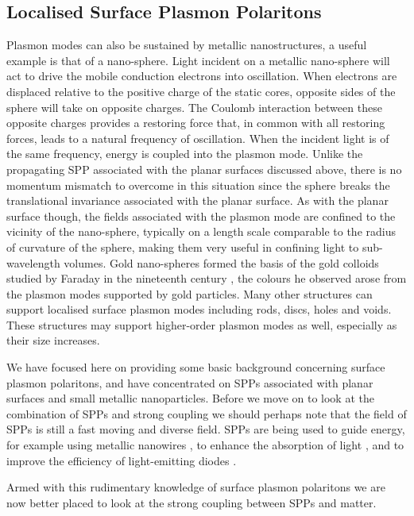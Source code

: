 \documentclass[12pt]{iopart}
\begin{document}
\subsection{Localised Surface Plasmon Polaritons}

Plasmon modes can also be sustained by metallic nanostructures, a useful example is that of a nano-sphere. Light incident on a metallic nano-sphere will act to drive the mobile conduction electrons into oscillation. When electrons are displaced relative to the positive charge of the static cores, opposite sides of the sphere will take on opposite charges. 
The Coulomb interaction between these opposite charges provides a restoring force that, in common with all restoring forces, leads to a natural frequency of oscillation. When the incident light is of the same frequency, energy is coupled into the plasmon mode. Unlike the propagating SPP associated with the planar surfaces discussed above, there is no momentum mismatch to overcome in this situation since the sphere breaks the translational invariance associated with the planar surface. As with the planar surface though, the fields associated with the plasmon mode are confined to the vicinity of the nano-sphere, typically on a length scale comparable to the radius of curvature of the sphere, making them very useful in confining light to sub-wavelength volumes. Gold nano-spheres formed the basis of the gold colloids studied by Faraday in the nineteenth century \cite{Faraday_PhilTrans_1857_147_145}, the colours he observed arose from the plasmon modes supported by  gold particles. Many other structures can support localised surface plasmon modes including rods, discs, holes and voids. These structures may support higher-order plasmon modes as well, especially as their size increases.

We have focused here on providing some basic background concerning surface plasmon polaritons, and have concentrated on SPPs associated with planar surfaces and small metallic nanoparticles. Before we move on to look at the combination of SPPs and strong coupling we should perhaps note that the field of SPPs is still a fast moving and diverse field. SPPs are being used to guide energy, for example using metallic nanowires \cite{Charbonneau_OL_2000_25_844}, to enhance the absorption of light \cite{Polyakov_PRL_2013_110_076802}, and to improve the efficiency of light-emitting diodes 
\cite{Smith_AdvFuncMat_2005_15_1839}.


Armed with this rudimentary knowledge of surface plasmon polaritons we are now better placed to look at the strong coupling between SPPs and matter.
\end{document}
